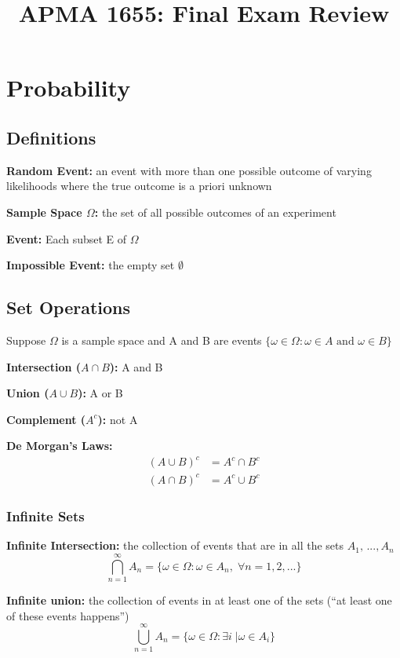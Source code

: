 \documentclass[12pt]{article}
\title{APMA 1655: Final Exam Review}
\date{}
\author{}
\begin{document}
\maketitle
\vspace*{-1in}
\tableofcontents
\section{Probability}
\subsection{Definitions}
\textbf{Random Event:} an event with more than one possible outcome of varying likelihoods where the true outcome is a priori unknown 

\textbf{Sample Space $\Omega$:} the set of all possible outcomes of an experiment

\textbf{Event:} Each subset E of $\Omega$

\textbf{Impossible Event:} the empty set $\emptyset$

\subsection{Set Operations}
Suppose $\Omega$ is a sample space and A and B are events $\{\omega \in \Omega: \omega \in A \text{ and } \omega \in B\}$

\textbf{Intersection ($A \cap B$):} A and B 

\textbf{Union ($A \cup B$):} A or B 

\textbf{Complement ($A^c$):} not A 

\textbf{De Morgan's Laws:}
\begin{align*}
    (A \cup B)^c &= A^c \cap B^c\\
    (A \cap B)^c &= A^c \cup B^c
\end{align*}

\subsubsection*{Infinite Sets}
\textbf{Infinite Intersection:} the collection of events that are in all the sets $A_1, \, ..., A_n$
\[\bigcap_{n=1}^\infty A_n = \{\omega \in \Omega : \omega \in A_n, \; \forall n = 1, 2, ...\}\]

\textbf{Infinite union:} the collection of events in at least one of the sets (``at least one of these events happens'')
\[\bigcup_{n=1}^\infty A_n = \{\omega \in \Omega: \exists i \;| \omega \in A_i\}\]
\end{document}
